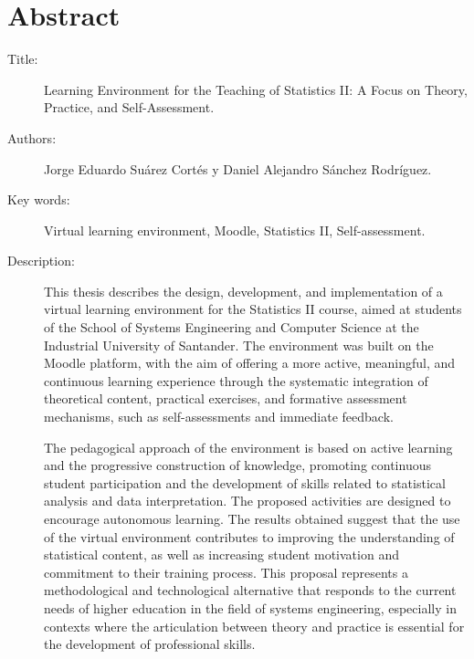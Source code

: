 \documentclass[letter,oneside,12pt,spanish]{report}
\begin{document}

\newpage

\chapter*{Abstract}

\footnotesize{
\begin{description}
  \item[Title:] Learning Environment for the Teaching of Statistics II: A Focus on Theory, Practice, and Self-Assessment.
  \item[Authors:] Jorge Eduardo Suárez Cortés y Daniel Alejandro Sánchez Rodríguez.
  \item[Key words:] Virtual learning environment, Moodle, Statistics II, Self-assessment.
  \item[Description:]This thesis describes the design, development, and implementation 
  of a virtual learning environment for the Statistics II course, aimed at students of 
  the School of Systems Engineering and Computer Science at the Industrial University of Santander. The 
  environment was built on the Moodle platform, with the aim of offering a more active, meaningful, and 
  continuous learning experience through the systematic integration of theoretical content, practical 
  exercises, and formative assessment mechanisms, such as self-assessments and immediate feedback.

  The pedagogical approach of the environment is based on active learning and the progressive construction of 
  knowledge, promoting continuous student participation and the development of skills 
  related to statistical analysis and data interpretation. The proposed activities are 
  designed to encourage autonomous learning. The results obtained suggest that the use of the
  virtual environment contributes to improving the understanding of statistical content, as well as increasing 
  student motivation and commitment to their training process. This proposal represents 
  a methodological and technological alternative that responds to the current needs of higher education
  in the field of systems engineering, especially in contexts where the articulation between theory and 
  practice is essential for the development of professional skills.

\end{description}}\normalsize
\end{document}
